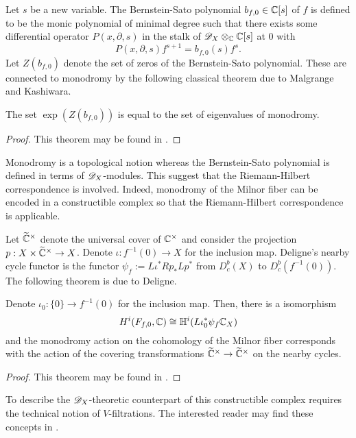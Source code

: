 Let $s$ be a new variable.
The Bernstein-Sato polynomial $b_{f,0}\in \mathbb{C}[s]$ of $f$ is defined to be the monic polynomial of minimal degree such that there exists some differential operator $P(x,\partial,s)$ in the stalk of $\mathscr{D}_X\otimes_{\mathbb{C}}\mathbb{C}[s]$ at $0$ with
$$P(x,\partial,s) f^{s+1} = b_{f,0}(s) f^s.$$
Let $Z(b_{f,0})$ denote the set of zeros of the Bernstein-Sato polynomial.
These are connected to monodromy by the following classical theorem due to Malgrange and Kashiwara.
\begin{theorem}
  The set $\exp(Z(b_{f,0}))$ is equal to the set of eigenvalues of monodromy.
\end{theorem}
\begin{proof}
  This theorem may be found in \cite{budur2015bernstein}.
\end{proof}
Monodromy is a topological notion whereas the Bernstein-Sato polynomial is defined in terms of $\mathscr{D}_X$-modules.
This suggest that the Riemann-Hilbert correspondence is involved.
Indeed, monodromy of the Milnor fiber can be encoded in a constructible complex so that the Riemann-Hilbert correspondence is applicable.

Let $\widetilde{\mathbb{C}}^\times$ denote the universal cover of $\mathbb{C}^\times$ and consider the projection $p:X\times \widetilde{\mathbb{C}}^\times \to X$.
Denote $\iota:f^{-1}(0)\to X$ for the inclusion map.
Deligne's nearby cycle functor is the functor $\psi_f:= L\iota^* Rp_* Lp^*$ from $D^b_c(X)$ to $D_c^b(f^{-1}(0))$.
The following theorem is due to Deligne.
\begin{theorem}
  Denote $\iota_0:\{0\}\to f^{-1}(0)$ for the inclusion map.
  Then, there is a isomorphism
  $$H^i(F_{f,0}, \mathbb{C}) \cong \mathbb{H}^i(L\iota_0^* \psi_f \mathbb{C}_X) $$
  and the monodromy action on the cohomology of the Milnor fiber corresponds with the action of the covering transformations $\widetilde{\mathbb{C}}^\times \to \widetilde{\mathbb{C}}^\times$ on the nearby cycles.
\end{theorem}
\begin{proof}
  This theorem may be found in \cite{budur2015bernstein}.
\end{proof}
To describe the $\mathscr{D}_X$-theoretic counterpart of this constructible complex requires the technical notion of $V$-filtrations.
The interested reader may find these concepts in \cite{budur2015bernstein}.
